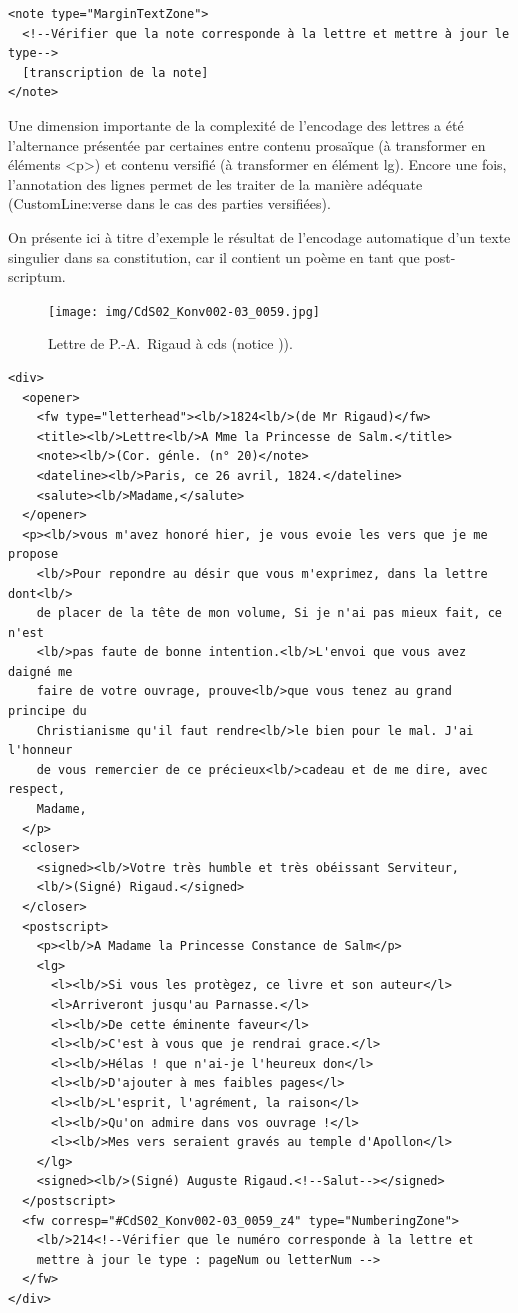 \documentclass[a4paper,12pt,twoside]{book}
\begin{document}
			\begin{verbatim}
<note type="MarginTextZone">
  <!--Vérifier que la note corresponde à la lettre et mettre à jour le type-->
  [transcription de la note]
</note>
			\end{verbatim}
		
			Une dimension importante de la complexité de l'encodage des lettres a été l'alternance présentée par certaines entre contenu prosaïque (à transformer en éléments \textsf{<p>}) et contenu versifié (à transformer en élément \textsf{lg}). Encore une fois, l'annotation des lignes permet de les traiter de la manière adéquate (\textsf{CustomLine:verse} dans le cas des parties versifiées).
			
			On présente ici à titre d'exemple le résultat de l'encodage automatique d'un texte singulier dans sa constitution, car il contient un poème en tant que post-scriptum.
			
			\begin{figure}[!h]
				\centering
				\texttt{[image: img/CdS02\_Konv002-03\_0059.jpg]}
				\caption{Lettre de P.-A.~Rigaud à \gls{cds} (notice \cite{CdS02059})).}
				\label{}
			\end{figure}
			
			\small
			
			\begin{verbatim}
<div>
  <opener>
    <fw type="letterhead"><lb/>1824<lb/>(de Mr Rigaud)</fw>
    <title><lb/>Lettre<lb/>A Mme la Princesse de Salm.</title>
    <note><lb/>(Cor. génle. (n° 20)</note>
    <dateline><lb/>Paris, ce 26 avril, 1824.</dateline>
    <salute><lb/>Madame,</salute>
  </opener>
  <p><lb/>vous m'avez honoré hier, je vous evoie les vers que je me propose
    <lb/>Pour repondre au désir que vous m'exprimez, dans la lettre dont<lb/>
    de placer de la tête de mon volume, Si je n'ai pas mieux fait, ce n'est
    <lb/>pas faute de bonne intention.<lb/>L'envoi que vous avez daigné me 
    faire de votre ouvrage, prouve<lb/>que vous tenez au grand principe du 
    Christianisme qu'il faut rendre<lb/>le bien pour le mal. J'ai l'honneur 
    de vous remercier de ce précieux<lb/>cadeau et de me dire, avec respect, 
    Madame,
  </p>
  <closer>
    <signed><lb/>Votre très humble et très obéissant Serviteur,
    <lb/>(Signé) Rigaud.</signed>
  </closer>
  <postscript>
    <p><lb/>A Madame la Princesse Constance de Salm</p>
    <lg>
      <l><lb/>Si vous les protègez, ce livre et son auteur</l>
      <l>Arriveront jusqu'au Parnasse.</l>
      <l><lb/>De cette éminente faveur</l>
      <l><lb/>C'est à vous que je rendrai grace.</l>
      <l><lb/>Hélas ! que n'ai-je l'heureux don</l>
      <l><lb/>D'ajouter à mes faibles pages</l>
      <l><lb/>L'esprit, l'agrément, la raison</l>
      <l><lb/>Qu'on admire dans vos ouvrage !</l>
      <l><lb/>Mes vers seraient gravés au temple d'Apollon</l>
    </lg>
    <signed><lb/>(Signé) Auguste Rigaud.<!--Salut--></signed>
  </postscript>
  <fw corresp="#CdS02_Konv002-03_0059_z4" type="NumberingZone">
    <lb/>214<!--Vérifier que le numéro corresponde à la lettre et 
    mettre à jour le type : pageNum ou letterNum -->
  </fw>
</div>

			\end{verbatim}
		
\end{document}
